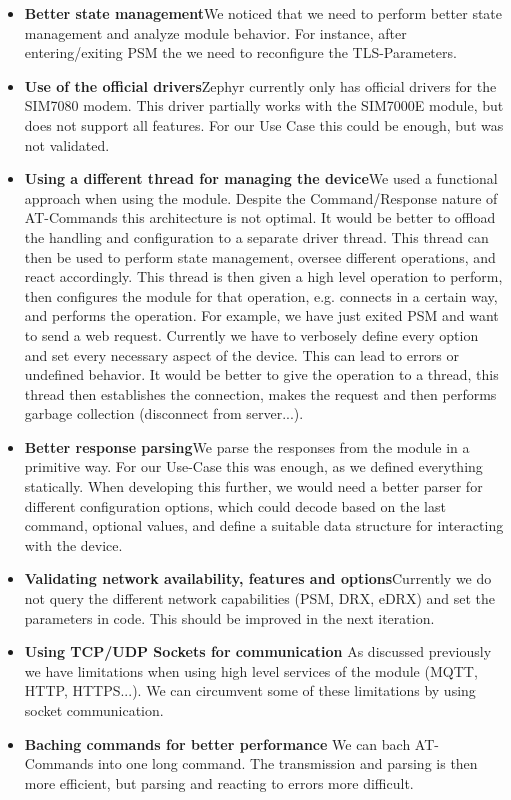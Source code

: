 \begin{itemize}
    \item \textbf{Better state management}\newline{}We noticed that we need to perform better state management and analyze module behavior. For instance, after entering/exiting PSM the we need to reconfigure the TLS-Parameters.
    \item \textbf{Use of the official drivers}\newline{}Zephyr currently only has official drivers for the SIM7080 modem. This driver partially works with the SIM7000E module, but does not support all features. For our Use Case this could be enough, but was not validated.
    \item \textbf{Using a different thread for managing the device}\newline{}We used a functional approach when using the module. 
    Despite the Command/Response nature of AT-Commands this architecture is not optimal. 
    It would be better to offload the handling and configuration to a separate driver thread. 
    This thread can then be used to perform state management, oversee different operations, and react accordingly.
    This thread is then given a high level operation to perform, then configures the module for that operation, e.g. connects in a certain way, and performs the operation.
    For example, we have just exited PSM and want to send a web request. Currently we have to verbosely define every option and set every necessary aspect of the device. This can lead to errors or undefined behavior.
    It would be better to give the operation to a thread, this thread then establishes the connection, makes the request and then performs garbage collection (disconnect from server...).
    \item \textbf{Better response parsing}\newline{}We parse the responses from the module in a primitive way. 
    For our Use-Case this was enough, as we defined everything statically. 
    When developing this further, we would need a better parser for different configuration options, which could decode based on the last command, optional values, and define a suitable data structure for interacting with the device.
    \item \textbf{Validating network availability, features and options}\newline{}Currently we do not query the different network capabilities (PSM, DRX, eDRX) and set the parameters in code. This should be improved in the next iteration.
    \item \textbf{Using TCP/UDP Sockets for communication}\newline{}
    As discussed previously we have limitations when using high level services of the module (MQTT, HTTP, HTTPS...). 
    We can circumvent some of these limitations by using socket communication.
    \item \textbf{Baching commands for better performance}\newline{}
    We can bach AT-Commands into one long command. The transmission and parsing is then more efficient, but parsing and reacting to errors more difficult.
\end{itemize}